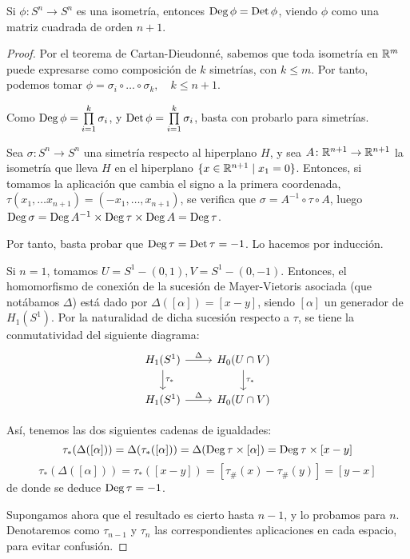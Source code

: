 \begin{lemma}
  Si $\phi \colon S^n \to S^n$ es una isometría, entonces $\operatorname{Deg} \phi = \operatorname{Det} \phi$, viendo $\phi$ como una matriz cuadrada
  de orden $n+1$.
\end{lemma}

\begin{proof}
  Por el teorema de Cartan-Dieudonné, sabemos que toda isometría en $\mathbb{R}^m$ puede expresarse como composición de
  $k$ simetrías, con $k \leq m$. Por tanto, podemos tomar $\phi = \sigma_i \circ \dots \circ \sigma_k, \quad k \leq n+1$.

  Como $\operatorname{Deg} \phi = \prod\limits_{i = 1}^k \sigma_i$, y $\operatorname{Det} \phi = \prod\limits_{i = 1}^k \sigma_i$, basta con probarlo para simetrías.

  Sea $\sigma \colon S^n \to S^n$ una simetría respecto al hiperplano $H$, y sea $A \colon \mathbb{R}^{n+1} \to \mathbb{R}^{n+1}$ la isometría
  que lleva $H$ en el hiperplano $\{x \in \mathbb{R}^{n+1} \mid x_1 = 0\}$. Entonces, si tomamos la aplicación que cambia el signo a la primera
  coordenada, $\tau(x_1, \dots x_{n+1}) = (-x_1, \dots, x_{n+1})$, se verifica que $\sigma = A^{-1} \circ \tau \circ A$, luego
  $\operatorname{Deg} \sigma = \operatorname{Deg} A^{-1} \times \operatorname{Deg} \tau \times \operatorname{Deg} A = \operatorname{Deg} \tau$.

  Por tanto, basta probar que $\operatorname{Deg} \tau = \operatorname{Det} \tau = -1$. Lo hacemos por inducción.

  Si $n = 1$, tomamos $U = S^1 - (0, 1), V = S^1 - (0, -1)$. Entonces, el homomorfismo de conexión de la sucesión
  de Mayer-Vietoris asociada (que notábamos $\Delta$) está dado por $\Delta([\alpha]) = [x-y]$, siendo $[\alpha]$ un generador de $H_1(S^1)$.
  Por la naturalidad de dicha sucesión respecto a $\tau$, se tiene la conmutatividad del siguiente diagrama:
  \[ \begin{tikzcd}
    H_1(S^1) \arrow{r}{\Delta} \arrow{d}{\tau_*} & H_0(U \cap V) \arrow{d}{\tau_*} \\
    H_1(S^1) \arrow{r}{\Delta} & H_0(U \cap V)
  \end{tikzcd} \]

  Así, tenemos las dos siguientes cadenas de igualdades:
  \[\tau_*(\Delta([\alpha])) = \Delta(\tau_*([\alpha])) = \Delta(\operatorname{Deg} \tau \times [\alpha]) = \operatorname{Deg} \tau \times [x-y]\]
  \[\tau_*(\Delta([\alpha])) = \tau_*([x-y]) = [\tau_\#(x) - \tau_\#(y)] = [y - x] \]
  de donde se deduce $\operatorname{Deg} \tau = -1$.

  Supongamos ahora que el resultado es cierto hasta $n-1$, y lo probamos para $n$. Denotaremos como $\tau_{n-1}$ y $\tau_{n}$
  las correspondientes aplicaciones en cada espacio, para evitar confusión.


\end{proof}
